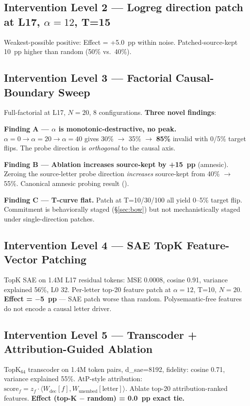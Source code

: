 \documentclass[11pt]{article}
\begin{document}
\subsection{Intervention Level 2 --- Logreg direction patch at L17, $\alpha=12$, T=15}
Weakest-possible positive: Effect = +5.0~pp within noise. Patched-source-kept 10~pp higher than random (50\% vs.\ 40\%).

\subsection{Intervention Level 3 --- Factorial Causal-Boundary Sweep}\label{sec:factorial}

Full-factorial at L17, $N=20$, 8 configurations. \textbf{Three novel findings}:

\textbf{Finding A --- $\alpha$ is monotonic-destructive, no peak.} $\alpha=0 \to \alpha=20 \to \alpha=40$ gives 30\% $\to$ 35\% $\to$ \textbf{85\%} invalid with 0/5\% target flips. The probe direction is \emph{orthogonal} to the causal axis.

\textbf{Finding B --- Ablation increases source-kept by +15~pp} (amnesic). Zeroing the source-letter probe direction \emph{increases} source-kept from 40\% $\to$ 55\%. Canonical amnesic probing result (\cite{elazar2021amnesic}).

\textbf{Finding C --- T-curve flat.} Patch at T=10/30/100 all yield 0--5\% target flip. Commitment is behaviorally staged (\S\ref{sec:bow}) but not mechanistically staged under single-direction patches.

\subsection{Intervention Level 4 --- SAE TopK Feature-Vector Patching}\label{sec:sae}
TopK SAE on 1.4M L17 residual tokens: MSE 0.0008, cosine 0.91, variance explained 56\%, L0 32. Per-letter top-20 feature patch at $\alpha=12$, T=10, $N=20$. \textbf{Effect = $-$5~pp} --- SAE patch worse than random. Polysemantic-free features do not encode a causal letter driver.

\subsection{Intervention Level 5 --- Transcoder + Attribution-Guided Ablation}\label{sec:transcoder}
TopK$_{64}$ transcoder on 1.4M token pairs, d\_sae=8192, fidelity: cosine 0.71, variance explained 55\%. AtP-style attribution: $\text{score}_f = z_f \cdot \langle W_\text{dec}[f], W_\text{unembed}[\text{letter}] \rangle$. Ablate top-20 attribution-ranked features. \textbf{Effect (top-K $-$ random) = 0.0~pp exact tie.}
\end{document}

